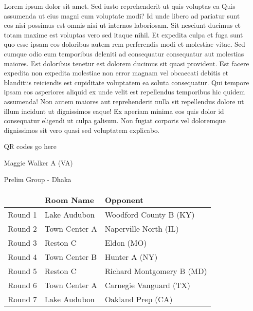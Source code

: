 \documentclass{article}%
\begin{document}
\vspace*{8pt}%
\linebreak%
\newline%
\newline%
Lorem ipsum dolor sit amet. Sed iusto reprehenderit ut quis voluptas ea Quis assumenda ut eius magni eum voluptate modi? Id unde libero ad pariatur sunt eos nisi possimus est omnis nisi ut internos laboriosam. Sit nesciunt ducimus et totam maxime est voluptas vero sed itaque nihil. Et expedita culpa et fuga sunt quo esse ipsam eos doloribus autem rem perferendis modi et molestiae vitae.\newline%
\newline%
Sed cumque odio eum temporibus deleniti ad consequatur consequatur aut molestias maiores. Est doloribus tenetur est dolorem ducimus sit quasi provident. Est facere expedita non expedita molestiae non error magnam vel obcaecati debitis et blanditiis reiciendis est cupiditate voluptatem ea soluta consequatur. Qui tempore ipsam eos asperiores aliquid ex unde velit est repellendus temporibus hic quidem assumenda!\newline%
\newline%
Non autem maiores aut reprehenderit nulla sit repellendus dolore ut illum incidunt ut dignissimos eaque! Ex aperiam minima eos quis dolor id consequatur eligendi ut culpa galisum. Non fugiat corporis vel doloremque dignissimos sit vero quasi sed voluptatem explicabo.\newline%
\newline%
%
\vspace*{30pt}%
\begin{center}%
\begin{Huge}%
QR codes go here%
\end{Huge}%
\end{center}%
\newpage%
%
\begin{center}%
\begin{Huge}%
Maggie Walker A (VA)%
\end{Huge}%
\vspace*{8pt}%
\linebreak%
\begin{Large}%
Prelim Group {-} Dhaka%
\end{Large}%
\end{center}%
\begin{tabularx}{\textwidth}{|c|Y|Y|}%
\hline%
&Room Name&Opponent\\%
\hline%
Round 1&Lake Audubon&Woodford County B (KY)\\%
Round 2&Town Center A&Naperville North (IL)\\%
Round 3&Reston C&Eldon (MO)\\%
Round 4&Town Center B&Hunter A (NY)\\%
Round 5&Reston C&Richard Montgomery B (MD)\\%
Round 6&Town Center A&Carnegie Vanguard (TX)\\%
Round 7&Lake Audubon&Oakland Prep (CA)\\%
\hline%
\end{tabularx}%
\end{document}
